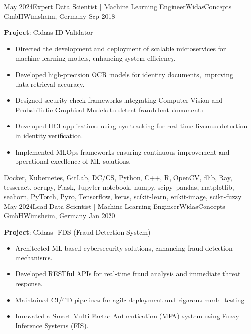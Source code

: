 %
%
%
\begin{experiences}
	\experience
	{May 2024}{Expert Data Scientist | Machine Learning Engineer}{WidasConcepts GmbH}{Wimsheim, Germany}
	{Sep 2018} {
		\vspace{0.1cm}
		\textbf{Project}: Cidaas-ID-Validator
		\begin{itemize}
			\item Directed the development and deployment of scalable microservices for machine learning models, enhancing system efficiency.
			\item Developed high-precision OCR models for identity documents, improving data retrieval accuracy.
			\item Designed security check frameworks integrating Computer Vision and Probabilistic Graphical Models to detect fraudulent documents.
			\item Developed HCI applications using eye-tracking for real-time liveness detection in identity verification.
			\item Implemented MLOps frameworks ensuring continuous improvement and operational excellence of ML solutions.
		\end{itemize}
	}
	{Docker, Kubernetes, GitLab, DC/OS, Python, C++, R,  OpenCV, dlib, Ray, tesseract, ocrupy, Flask, Jupyter-notebook, numpy, scipy, pandas, matplotlib, seaborn, PyTorch, Pyro, Tensorflow, keras, scikit-learn, scikit-image, scikt-fuzzy}
	\emptySeparator
	\experience
	{May 2024}{Lead Data Scientist | Machine Learning Engineer}{WidasConcepts GmbH}{Wimsheim, Germany}
	{Jan 2020} {
		\vspace{0.1cm}
		\textbf{Project}: Cidaas- FDS (Fraud Detection System)
		\begin{itemize}
			\item Architected ML-based cybersecurity solutions, enhancing fraud detection mechanisms.
			\item Developed RESTful APIs for real-time fraud analysis and immediate threat response.
			\item Maintained CI/CD pipelines for agile deployment and rigorous model testing.
			\item Innovated a Smart Multi-Factor Authentication (MFA) system using Fuzzy Inference Systems (FIS).

\end{itemize}}
\end{experiences}
